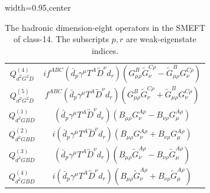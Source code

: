 \begin{table}[H]
\begin{center}
\begin{adjustbox}{width=0.95\textwidth,center}
\begin{minipage}[t]{7.4cm}
\begin{tabular}[t]{c|c}
%
$Q_{d^2G^2D}^{(4)}$  &  $i f^{ABC} (\bar d_p \gamma^\mu T^A \overleftrightarrow{D}^\nu d_r) (G_{\mu\rho}^B \widetilde{G}_{\nu}^{C\rho} - \widetilde{G}_{\mu\rho}^B G_{\nu}^{C\rho})$ \\
%
$Q_{d^2G^2D}^{(5)}$  &  $f^{ABC} (\bar d_p \gamma^\mu T^A \overleftrightarrow{D}^\nu d_r) (G_{\mu\rho}^B \widetilde{G}_{\nu}^{C\rho} + \widetilde{G}_{\mu\rho}^B G_{\nu}^{C\rho})$ \\
%
$Q_{d^2GBD}^{(1)}$  &  $(\bar d_p \gamma^\mu T^A \overleftrightarrow{D}^\nu d_r) (B_{\mu\rho} G_{\nu}^{A\rho} - B_{\nu\rho} G_{\mu}^{A\rho})$ \\
%
$Q_{d^2GBD}^{(2)}$  &  $i (\bar d_p \gamma^\mu T^A \overleftrightarrow{D}^\nu d_r) (B_{\mu\rho} G_{\nu}^{A\rho} + B_{\nu\rho} G_{\mu}^{A\rho})$ \\
%
$Q_{d^2GBD}^{(3)}$  &  $(\bar d_p \gamma^\mu T^A \overleftrightarrow{D}^\nu d_r) (B_{\mu\rho} \widetilde{G}_\nu^{A \rho} - B_{\nu\rho} \widetilde{G}_\mu^{A \rho})$ \\
%
$Q_{d^2GBD}^{(4)}$  &  $i (\bar d_p \gamma^\mu T^A \overleftrightarrow{D}^\nu d_r) (B_{\mu\rho} \widetilde{G}_\nu^{A \rho} + B_{\nu\rho} \widetilde{G}_\mu^{A \rho})$ 
\end{tabular}
\end{minipage}
\end{adjustbox}
\end{center}
\caption{The hadronic dimension-eight operators in the SMEFT of class-14. The subscripts $p, r$ are weak-eigenstate indices.}
\label{tab:smeft8class_14qud}
\end{table}